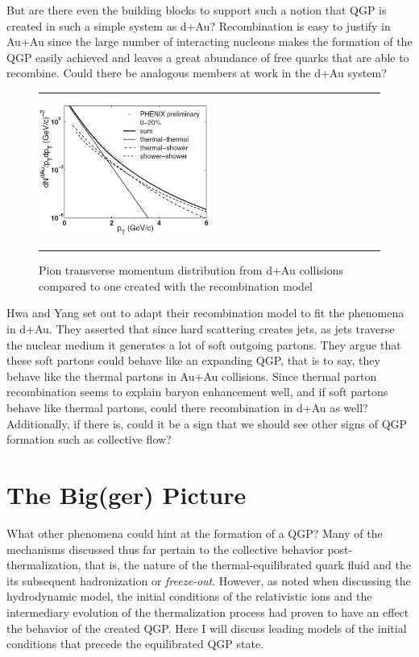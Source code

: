 But are there even the building blocks to support such a notion that QGP is created in such a simple system as d+Au? Recombination is easy to justify in Au+Au since the large number of interacting nucleons makes the formation of the QGP easily achieved and leaves a great abundance of free quarks that are able to recombine. Could there be analogous members at work in the d+Au system? 
\begin{figure}[b!]
  \centering
    \rule{35em}{0.5pt}
    \includegraphics[width=0.5\textwidth]{prevplots/daurecomb.JPG}

  \caption[Pion transverse momentum distribution from d+Au collisions compared to one created with the recombination model]{Pion transverse momentum distribution from d+Au collisions compared to one created with the recombination model}
  \label{fig:daaaratios}
    \rule{35em}{0.5pt}
\end{figure}
Hwa and Yang set out to adapt their recombination model to fit the phenomena in d+Au\citep{PhysRevLett.93.082302}. They asserted that since hard scattering creates jets, as jets traverse the nuclear medium it generates a lot of soft outgoing partons. They argue that these soft partons could behave like an expanding QGP, that is to say, they behave like the thermal partons in Au+Au collisions. Since thermal parton recombination seems to explain baryon enhancement well, and if soft partons behave like thermal partons, could there recombination in d+Au as well? Additionally, if there is, could it be a sign that we should see other signs of QGP formation such as collective flow? 

\section{The Big(ger) Picture}
What other phenomena could hint at the formation of a QGP? Many of the mechanisms discussed thus far pertain to the collective behavior post-thermalization, that is, the nature of the thermal-equilibrated quark fluid and the its subsequent hadronization or \textit{freeze-out}. However, as noted when discussing the hydrodynamic model, the initial conditions of the relativistic ions and the intermediary evolution of the thermalization process had proven to have an effect the behavior of the created QGP. Here I will discuss leading models of the initial conditions that precede the equilibrated QGP state.

